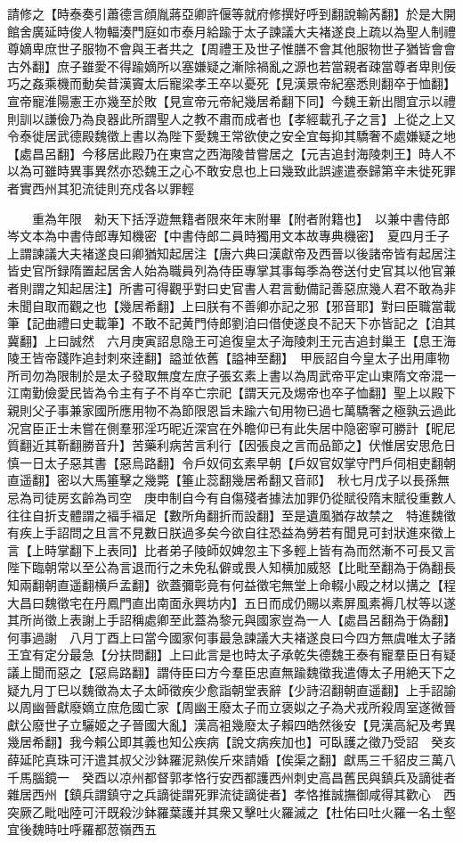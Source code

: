 請修之【時泰奏引蕭德言顔胤蔣亞卿許偃等就府修撰好呼到翻說輸芮翻】於是大開館舍廣延時俊人物輻湊門庭如市泰月給踰于太子諫議大夫褚遂良上疏以為聖人制禮尊嫡卑庶世子服物不會與王者共之【周禮王及世子惟膳不會其他服物世子猶皆會會古外翻】庶子雖愛不得踰嫡所以塞嫌疑之漸除禍亂之源也若當親者疎當尊者卑則佞巧之姦乘機而動矣昔漢竇太后寵梁孝王卒以憂死【見漢景帝紀塞悉則翻卒于恤翻】宣帝寵淮陽憲王亦幾至於敗【見宣帝元帝紀幾居希翻下同】今魏王新出閤宜示以禮則訓以謙儉乃為良器此所謂聖人之教不肅而成者也【孝經載孔子之言】上從之上又令泰徙居武德殿魏徵上書以為陛下愛魏王常欲使之安全宜每抑其驕奢不處嫌疑之地【處昌呂翻】今移居此殿乃在東宫之西海陵昔嘗居之【元吉追封海陵刺王】時人不以為可雖時異事異然亦恐魏王之心不敢安息也上曰幾致此誤遽遣泰歸第辛未徙死罪者實西州其犯流徒則充戍各以罪輕

　　重為年限　勑天下括浮遊無籍者限來年末附畢【附者附籍也】　以兼中書侍郎岑文本為中書侍郎專知機密【中書侍郎二員時獨用文本故專典機密】　夏四月壬子上謂諫議大夫褚遂良曰卿猶知起居注【唐六典曰漢獻帝及西晉以後諸帝皆有起居注皆史官所録隋置起居舍人始為職員列為侍臣專掌其事每季為卷送付史官其以他官兼者則謂之知起居注】所書可得觀乎對曰史官書人君言動備記善惡庶幾人君不敢為非未聞自取而觀之也【幾居希翻】上曰朕有不善卿亦記之邪【邪音耶】對曰臣職當載筆【記曲禮曰史載筆】不敢不記黄門侍郎劉洎曰借使遂良不記天下亦皆記之【洎其冀翻】上曰誠然　六月庚寅詔息隐王可追復皇太子海陵刺王元吉追封巢王【息王海陵王皆帝踐阼追封刺來逹翻】謚並依舊【謚神至翻】　甲辰詔自今皇太子出用庫物所司勿為限制於是太子發取無度左庶子張玄素上書以為周武帝平定山東隋文帝混一江南勤儉愛民皆為令主有子不肖卒亡宗祀【謂天元及焬帝也卒子恤翻】聖上以殿下親則父子事兼家國所應用物不為節限恩旨未踰六旬用物已過七萬驕奢之極孰云過此况宫臣正士未嘗在側羣邪淫巧昵近深宫在外瞻仰已有此失居中隐密寧可勝計【昵尼質翻近其靳翻勝音升】苦藥利病苦言利行【因張良之言而品節之】伏惟居安思危日慎一日太子惡其書【惡烏路翻】令戶奴伺玄素早朝【戶奴官奴掌守門戶伺相吏翻朝直遥翻】密以大馬箠擊之幾斃【箠止蕊翻幾居希翻又音祁】　秋七月戊子以長孫無忌為司徒房玄齡為司空　庚申制自今有自傷殘者據法加罪仍從賦役隋末賦役重數人往往自折支體謂之褔手褔足【數所角翻折而設翻】至是遺風猶存故禁之　特進魏徵有疾上手詔問之且言不見數日朕過多矣今欲自往恐益為勞若有聞見可封狀進來徵上言【上時掌翻下上表同】比者弟子陵師奴婢忽主下多輕上皆有為而然漸不可長又言陛下臨朝常以至公為言退而行之未免私僻或畏人知横加威怒【比毗至翻為于偽翻長知兩翻朝直遥翻横戶孟翻】欲蓋彌彰竟有何益徵宅無堂上命輟小殿之材以搆之【程大昌曰魏徵宅在丹鳳門直出南面永興坊内】五日而成仍賜以素屏風素褥几杖等以遂其所尚徵上表謝上手詔稱處卿至此蓋為黎元與國家豈為一人【處昌呂翻為于偽翻】何事過謝　八月丁酉上曰當今國家何事最急諫議大夫褚遂良曰今四方無虞唯太子諸王宜有定分最急【分扶問翻】上曰此言是也時太子承乾失德魏王泰有寵羣臣日有疑議上聞而惡之【惡烏路翻】謂侍臣曰方今羣臣忠直無踰魏徵我遣傳太子用絶天下之疑九月丁巳以魏徵為太子太師徵疾少愈詣朝堂表辭【少詩沼翻朝直遥翻】上手詔諭以周幽晉獻廢嫡立庶危國亡家【周幽王廢太子而立褒姒之子為犬戎所殺周室遂微晉獻公廢世子立驪姬之子晉國大亂】漢高袓幾廢太子賴四皓然後安【見漢高紀及考異幾居希翻】我今賴公即其義也知公疾病【說文病疾加也】可臥護之徵乃受詔　癸亥薛延陀真珠可汗遣其叔父沙鉢羅泥熟俟斤來請婚【俟渠之翻】獻馬三千貂皮三萬八千馬腦鏡一　癸酉以凉州都督郭孝恪行安西都護西州刺史高昌舊民與鎮兵及謫徙者雜居西州【鎮兵謂鎮守之兵謫徙謂死罪流徒謫徙者】孝恪推誠撫御咸得其歡心　西突厥乙毗咄陸可汗既殺沙鉢羅葉護并其衆又擊吐火羅滅之【杜佑曰吐火羅一名土壑宜後魏時吐呼羅都䓤嶺西五